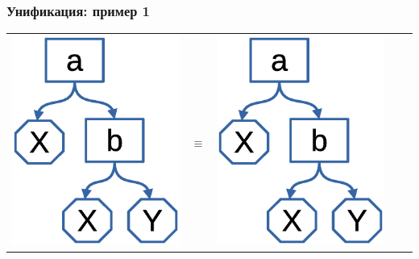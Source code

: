 \documentclass{../../slides-style}
\begin{document}
    \begin{frame}
        \frametitle{Унификация: пример 1}
    \begin{tabular}{m{25mm}cm{25mm}cm{25mm}}
    \includegraphics[scale=0.4]{term1.eps} &
    \textbf{\Huge $\equiv$} &
    \includegraphics[scale=0.4]{term1.eps} &

\end{tabular}
\end{frame}
\end{document}
